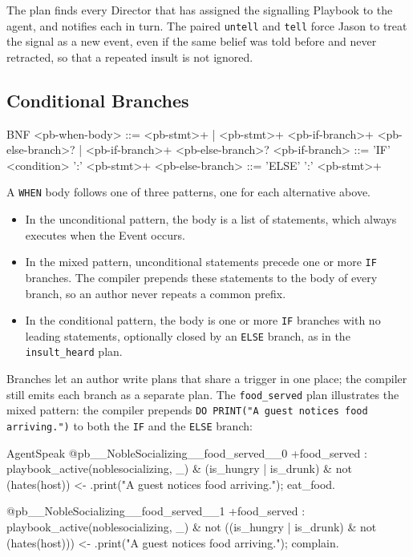 The plan finds every Director that has assigned the signalling Playbook to the agent, and notifies each in turn. The paired \lstinline|untell| and \lstinline|tell| force Jason to treat the signal as a new event, even if the same belief was told before and never retracted, so that a repeated insult is not ignored.
 
\subsection{Conditional Branches}
\label{subsec:conditional-branches}
\begin{codeblock}[]{BNF}
    <pb-when-body>      ::= <pb-stmt>+
                          | <pb-stmt>+ <pb-if-branch>+ <pb-else-branch>?
                          | <pb-if-branch>+ <pb-else-branch>?
    <pb-if-branch>      ::= 'IF' <condition> ':' <pb-stmt>+
    <pb-else-branch>    ::= 'ELSE' ':' <pb-stmt>+
\end{codeblock}
 
A \lstinline|WHEN| body follows one of three patterns, one for each alternative above.
 
\begin{itemize}
    \item In the unconditional pattern, the body is a list of statements, which always executes when the Event occurs.
    \item In the mixed pattern, unconditional statements precede one or more \lstinline|IF| branches. The compiler prepends these statements to the body of every branch, so an author never repeats a common prefix.
    \item In the conditional pattern, the body is one or more \lstinline|IF| branches with no leading statements, optionally closed by an \lstinline|ELSE| branch, as in the \lstinline|insult_heard| plan.
\end{itemize}
 
Branches let an author write plans that share a trigger in one place; the compiler still emits each branch as a separate plan. The \lstinline|food_served| plan illustrates the mixed pattern: the compiler prepends \lstinline|DO PRINT("A guest notices food arriving.")| to both the \lstinline|IF| and the \lstinline|ELSE| branch:
 
\begin{codeblock}[]{AgentSpeak}
@pb__NobleSocializing__food_served__0
+food_served : playbook_active(noblesocializing, _)
    & (is_hungry | is_drunk) & not (hates(host)) <-
    .print("A guest notices food arriving.");
    eat_food.
 
@pb__NobleSocializing__food_served__1
+food_served : playbook_active(noblesocializing, _)
    & not ((is_hungry | is_drunk) & not (hates(host))) <-
    .print("A guest notices food arriving.");
    complain.
\end{codeblock}
 
